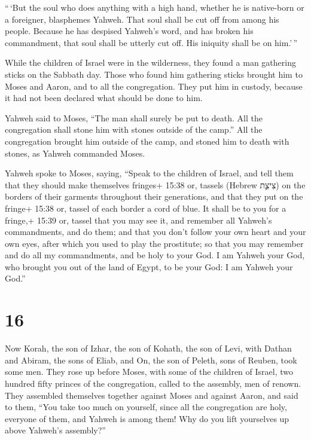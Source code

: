  ``\,`But the soul who does anything with a high hand,
whether he is native-born or a foreigner, blasphemes Yahweh. That soul
shall be cut off from among his people.  Because he has
despised Yahweh's word, and has broken his commandment, that soul shall
be utterly cut off. His iniquity shall be on him.'\,''

 While the children of Israel were in the wilderness, they
found a man gathering sticks on the Sabbath day.  Those who
found him gathering sticks brought him to Moses and Aaron, and to all
the congregation.  They put him in custody, because it had
not been declared what should be done to him.

 Yahweh said to Moses, ``The man shall surely be put to
death. All the congregation shall stone him with stones outside of the
camp.''  All the congregation brought him outside of the
camp, and stoned him to death with stones, as Yahweh commanded Moses.

 Yahweh spoke to Moses, saying,  ``Speak to
the children of Israel, and tell them that they should make themselves
fringes+ 15:38 or, tassels (Hebrew צִיצִ֛ת) on the borders of their
garments throughout their generations, and that they put on the fringe+
15:38 or, tassel of each border a cord of blue.  It shall
be to you for a fringe,+ 15:39 or, tassel that you may see it, and
remember all Yahweh's commandments, and do them; and that you don't
follow your own heart and your own eyes, after which you used to play
the prostitute;  so that you may remember and do all my
commandments, and be holy to your God.  I am Yahweh your
God, who brought you out of the land of Egypt, to be your God: I am
Yahweh your God.''

\hypertarget{section-15}{%
\section{16}\label{section-15}}

 Now Korah, the son of Izhar, the son of Kohath, the son of
Levi, with Dathan and Abiram, the sons of Eliab, and On, the son of
Peleth, sons of Reuben, took some men.  They rose up before
Moses, with some of the children of Israel, two hundred fifty princes of
the congregation, called to the assembly, men of renown. 
They assembled themselves together against Moses and against Aaron, and
said to them, ``You take too much on yourself, since all the
congregation are holy, everyone of them, and Yahweh is among them! Why
do you lift yourselves up above Yahweh's assembly?''

